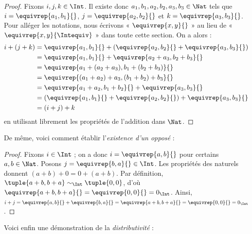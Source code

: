 \documentclass[11pt,a4paper,openany]{memoir}
\begin{document}
\begin{proof}
Fixons $i, j, k \in \Int$. Il existe donc
$a_1, b_1, a_2, b_2, a_3, b_3 \in \Nat$ tels que
$i = \equivrep{a_1, b_1}{}$, $j = \equivrep{a_2,b_2}{}$ et
$k = \equivrep{a_3, b_3}{}$. Pour alléger les notations, nous écrivons
« $\equivrep{x, y}{}$ » au lieu de
« $\equivrep{x, y}{\Intequiv}$ » dans toute cette section. On a alors :
\begin{align*}
  i + (j + k) &= \equivrep{a_1, b_1}{}+(\equivrep{a_2, b_2}{} + \equivrep{a_3, b_3}{}) \\
  &= \equivrep{a_1, b_1}{} + \equivrep{a_2+a_3, b_2+b_3}{}\\
  &= \equivrep{a_1 + (a_2 + a_3), b_1 + (b_2 + b_3)}{}\\
  &= \equivrep{(a_1 + a_2) + a_3, (b_1 + b_2) + b_3}{}\\
  &= \equivrep{a_1 + a_2, b_1 + b_2}{} + \equivrep{a_3, b_3}{}\\
  &= (\equivrep{a_1, b_1}{} + \equivrep{a_2, b_2}{}) + \equivrep{a_3, b_3}{}\\
  &= (i+j) + k
\end{align*}
en utilisant librement les propriétés de l'addition dans $\Nat$.
\end{proof}

De même, voici comment établir l'\emph{existence d'un opposé} :

\begin{proof}
Fixons $i \in \Int$ ; on a donc $i = \equivrep{a,b}{}$ pour certains
$a,b \in \Nat$. Posons $j = \equivrep{b,a}{} \in \Int$.
Les propriétés des naturels donnent $(a+b) + 0 = 0 + (a+b)$.
Par définition, $\tuple{a+b, b+a} \sim_\Int \tuple{0,0}$, d'où
$\equivrep{a+b, b+a}{} = \equivrep{0, 0}{} = 0_\Int$.
Ainsi, $i + j = \equivrep{a,b}{}+\equivrep{b,a}{}
=\equivrep{a+b, b+a}{}=\equivrep{0,0}{} = 0_\Int$.
\end{proof}

Voici enfin une démonstration de la \emph{distributivité} :
\end{document}
